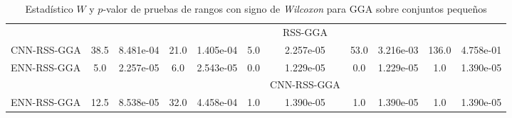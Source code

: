 \begin{table}[]
\begin{adjustbox}{max width =\textwidth}
\begin{tabular}{l c c c c c c c c c c}
\hline

 & & & & & & RSS-GGA & & & & \\
CNN-RSS-GGA & 38.5 & 8.481e-04 & 21.0 & 1.405e-04 & 5.0 & 2.257e-05 & 53.0 & 3.216e-03 & 136.0 & 4.758e-01 \\ 
ENN-RSS-GGA & 5.0 & 2.257e-05 & 6.0 & 2.543e-05 & 0.0 & 1.229e-05 & 0.0 & 1.229e-05 & 1.0 & 1.390e-05 \\ 

\hline

 & & & & & & CNN-RSS-GGA & & & & \\ 
ENN-RSS-GGA & 12.5 & 8.538e-05 & 32.0 & 4.458e-04 & 1.0 & 1.390e-05 & 1.0 & 1.390e-05 & 1.0 & 1.390e-05 \\

\hline 

\end{tabular}
\end{adjustbox}
\caption[Pruebas de \emph{Wilcoxon} entre GGA y variaciones para conjuntos pequeños]{Estadístico $W$ y $p$-valor de pruebas de rangos con signo de \emph{Wilcoxon} para GGA sobre conjuntos pequeños}
\label{wilcox-gga-peq}
\end{table}

